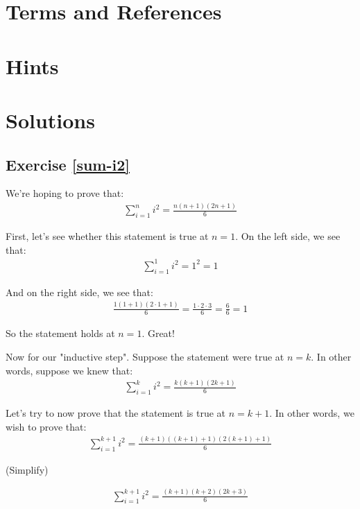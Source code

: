 \newpage
\section{Terms and References}

\section{Hints}

\newpage
\section{Solutions}

\subsection{Exercise \ref{sum-i2}}


We're hoping to prove that:
\begin{align*}
\sum_{i=1}^{n} i^2 = \frac{n(n+1)(2n+1)}{6}
\end{align*}

First, let's see whether this statement is true at $n = 1$. On the left side, we see that:
\begin{align*}
\sum_{i=1}^{1} i^2 = 1^2 = 1
\end{align*}

And on the right side, we see that:
\begin{align*}
\frac{1(1+1)(2 \cdot 1+1)}{6} = \frac{1 \cdot 2 \cdot 3}{6} = \frac{6}{6} = 1
\end{align*}

So the statement holds at $n = 1$. Great!


Now for our "inductive step". Suppose the statement were true at $n = k$. In other words, suppose we knew that:
\begin{align*}
\sum_{i=1}^{k} i^2 = \frac{k(k+1)(2k+1)}{6}
\end{align*}

Let's try to now prove that the statement is true at $n = k + 1$. In other words, we wish to prove that:
\begin{align*}
\sum_{i=1}^{k+1} i^2 = \frac{(k+1)((k+1)+1)(2(k+1)+1)}{6}
\end{align*}

(Simplify)

\begin{align*}
\sum_{i=1}^{k+1} i^2 = \frac{(k+1)(k+2)(2k+3)}{6}
\end{align*}

